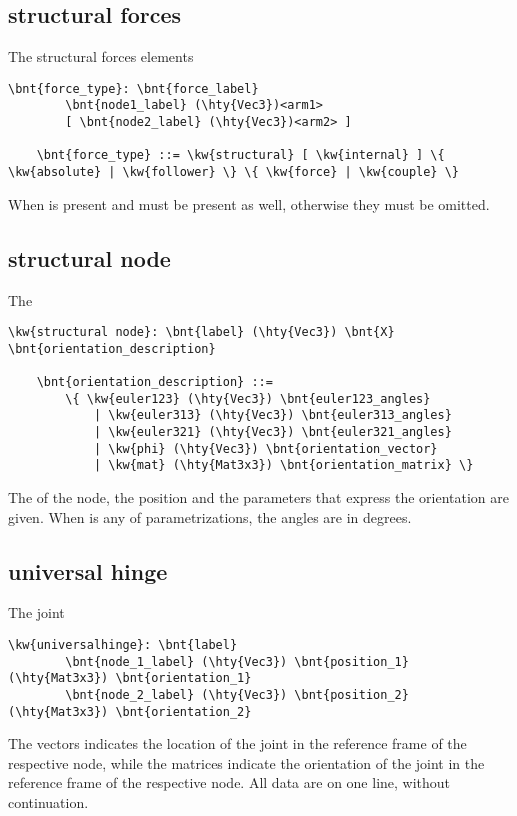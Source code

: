 \subsection{structural forces}
The structural forces elements
\begin{Verbatim}[commandchars=\\\{\}]
    \bnt{force_type}: \bnt{force_label}
        \bnt{node1_label} (\hty{Vec3})<arm1>
        [ \bnt{node2_label} (\hty{Vec3})<arm2> ]

    \bnt{force_type} ::= \kw{structural} [ \kw{internal} ] \{ \kw{absolute} | \kw{follower} \} \{ \kw{force} | \kw{couple} \}
\end{Verbatim}
When  is present  and  must be present
as well, otherwise they must be omitted.

\subsection{structural node}
\label{sec:APP:LOGFILE:STRUCTURAL_NODE}
The 
\begin{Verbatim}[commandchars=\\\{\}]
    \kw{structural node}: \bnt{label} (\hty{Vec3}) \bnt{X} \bnt{orientation_description}

    \bnt{orientation_description} ::=
        \{ \kw{euler123} (\hty{Vec3}) \bnt{euler123_angles}
            | \kw{euler313} (\hty{Vec3}) \bnt{euler313_angles}
            | \kw{euler321} (\hty{Vec3}) \bnt{euler321_angles}
            | \kw{phi} (\hty{Vec3}) \bnt{orientation_vector}
            | \kw{mat} (\hty{Mat3x3}) \bnt{orientation_matrix} \}
\end{Verbatim}
The  of the node, the position 
and the  parameters that express the orientation
are given.
When  is any of  parametrizations,
the angles are in degrees.

\subsection{universal hinge}
The  joint
\begin{Verbatim}[commandchars=\\\{\}]
    \kw{universalhinge}: \bnt{label}
        \bnt{node_1_label} (\hty{Vec3}) \bnt{position_1} (\hty{Mat3x3}) \bnt{orientation_1}
        \bnt{node_2_label} (\hty{Vec3}) \bnt{position_2} (\hty{Mat3x3}) \bnt{orientation_2}
\end{Verbatim}
The  vectors indicates the location of the joint
in the reference frame of the respective node,
while the  matrices indicate the orientation of the joint
in the reference frame of the respective node.
All data are on one line, without continuation.

